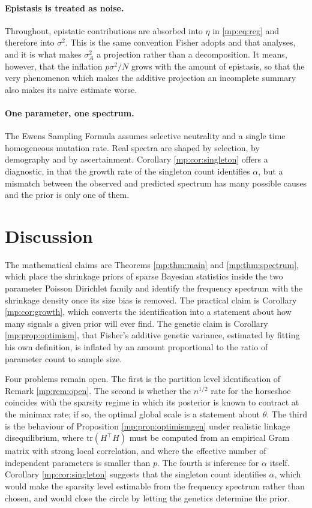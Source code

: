 \paragraph{Epistasis is treated as noise.} Throughout, epistatic contributions are absorbed
into $\eta$ in \eqref{mp:eq:reg} and therefore into $\sigma^2$. This is the same convention
Fisher adopts and that \citet{mp:ewens2024} analyses, and it is what makes $\sigma_A^2$ a
projection rather than a decomposition. It means, however, that the inflation
$p\sigma^2/N$ grows with the amount of epistasis, so that the very phenomenon which makes
the additive projection an incomplete summary also makes its naive estimate worse.

\paragraph{One parameter, one spectrum.} The Ewens Sampling Formula assumes selective
neutrality and a single time homogeneous mutation rate. Real spectra are shaped by
selection, by demography and by ascertainment. Corollary \ref{mp:cor:singleton} offers a
diagnostic, in that the growth rate of the singleton count identifies $\alpha$, but a
mismatch between the observed and predicted spectrum has many possible causes and the prior
is only one of them.

\section{Discussion}
\label{mp:sec:disc}

The mathematical claims are Theorems \ref{mp:thm:main} and \ref{mp:thm:spectrum}, which place the
shrinkage priors of sparse Bayesian statistics inside the two parameter Poisson Dirichlet
family and identify the frequency spectrum with the shrinkage density once its size bias is removed. The
practical claim is Corollary \ref{mp:cor:growth}, which converts the identification into a
statement about how many signals a given prior will ever find. The genetic claim is
Corollary \ref{mp:prop:optimism}, that Fisher's additive genetic variance, estimated by fitting
his own definition, is inflated by an amount proportional to the ratio of parameter count to sample size.

Four problems remain open. The first is the partition level identification of Remark
\ref{mp:rem:open}. The second is whether the $n^{1/2}$ rate for the horseshoe coincides with
the sparsity regime in which its posterior is known to contract at the minimax rate; if so,
the optimal global scale is a statement about $\theta$. The third is the behaviour of
Proposition \ref{mp:prop:optimismgen} under realistic linkage disequilibrium, where
$\mathrm{tr}(H^\top H)$ must be computed from an empirical Gram matrix with strong local
correlation, and where the effective number of independent parameters is smaller than $p$.
The fourth is inference for $\alpha$ itself. Corollary \ref{mp:cor:singleton} suggests that the
singleton count identifies $\alpha$, which would make the sparsity level estimable from the
frequency spectrum rather than chosen, and would close the circle by letting the genetics
determine the prior.




